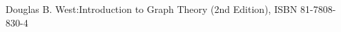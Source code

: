 \documentclass[12pt, oneside]{book}
\begin{document}
\thispagestyle{empty}
\nocite{*}
\clearpage



% 

\begin{thebibliography}{11}
	
 Douglas B. West:Introduction to Graph Theory (2nd Edition), ISBN 81-7808-830-4

\end{thebibliography}



%
%
%
%
\end{document}
